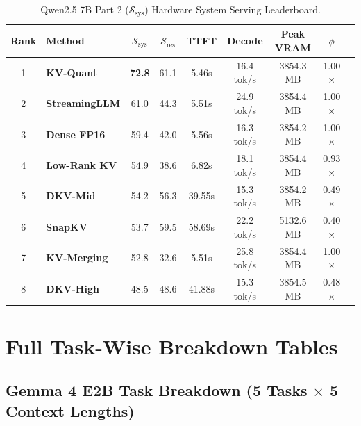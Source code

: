 \documentclass[10pt]{article}
\theoremstyle{definition}
\begin{document}
\begin{table}[h]
\vspace{6pt}
\centering
\small
\caption{Qwen2.5 7B Part 2 ($\mathcal{S}_{\text{sys}}$) Hardware System Serving Leaderboard.}
\label{tab:q7b_ssys}
\begin{tabular}{clccccccc}
\toprule
\textbf{Rank} & \textbf{Method} & $\mathcal{S}_{\text{sys}}$ & $\mathcal{S}_{\text{res}}$ & \textbf{TTFT} & \textbf{Decode} & \textbf{Peak VRAM} & $\phi$ \\
\midrule
1 & \textbf{KV-Quant} & \textbf{72.8} & 61.1 & 5.46s & 16.4 tok/s & 3854.3 MB & 1.00$\times$ \\
2 & \textbf{StreamingLLM} & 61.0 & 44.3 & 5.51s & 24.9 tok/s & 3854.4 MB & 1.00$\times$ \\
3 & \textbf{Dense FP16} & 59.4 & 42.0 & 5.56s & 16.3 tok/s & 3854.2 MB & 1.00$\times$ \\
4 & \textbf{Low-Rank KV} & 54.9 & 38.6 & 6.82s & 18.1 tok/s & 3854.4 MB & 0.93$\times$ \\
5 & \textbf{DKV-Mid} & 54.2 & 56.3 & 39.55s & 15.3 tok/s & 3854.2 MB & 0.49$\times$ \\
6 & \textbf{SnapKV} & 53.7 & 59.5 & 58.69s & 22.2 tok/s & 5132.6 MB & 0.40$\times$ \\
7 & \textbf{KV-Merging} & 52.8 & 32.6 & 5.51s & 25.8 tok/s & 3854.4 MB & 1.00$\times$ \\
8 & \textbf{DKV-High} & 48.5 & 48.6 & 41.88s & 15.3 tok/s & 3854.5 MB & 0.48$\times$ \\
\bottomrule
\end{tabular}
\end{table}

\clearpage
\section{Full Task-Wise Breakdown Tables}
\label{sec:app_tasks}

\subsection{Gemma 4 E2B Task Breakdown (5 Tasks \texorpdfstring{$\times$}{x} 5 Context Lengths)}
\end{document}
